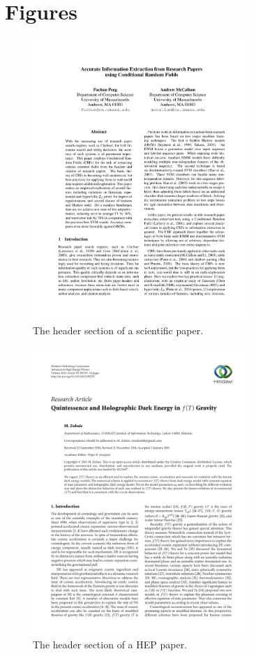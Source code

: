 
\chapter{Figures} %

\label{AppendixB} %


\begin{figure}[!ht]
\center
\includegraphics[width=3.25in]{Figures/header1.pdf}
\caption{The header section of a scientific paper.}
\label{fig:HMM}
\end{figure}

\begin{figure}[!ht]
\center
\includegraphics[width=3.25in]{Figures/header2.pdf}
\caption{The header section of a HEP paper.}
\label{fig:HMM}
\end{figure}
